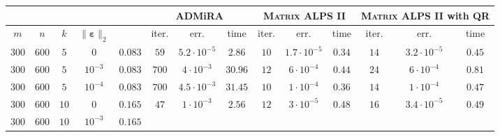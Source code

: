 \documentclass[twocolumn]{svjour3}
\newcommand{\vectornormbig}[1]{\big\|#1\big\|}
\newcommand{\noise}{\boldsymbol{\varepsilon}}
\newcommand{\rank}{k}
\begin{document}
\begin{table*}[!htp]
\begin{center}
\begin{tabular}{|c|c|c|c|c|c|c|c|c|c|c|c|c|c|}
\hline \hline \hline
\multicolumn{4}{c|}{} & & \multicolumn{3}{|c|}{ADMiRA} & \multicolumn{3}{|c|}{\textsc{Matrix ALPS II}} & \multicolumn{3}{|c}{\textsc{Matrix ALPS II} with QR} \\
\hline \hline
\multicolumn{1}{c}{$m$} & \multicolumn{1}{c}{$n$} & \multicolumn{1}{c}{$\rank$} & \multicolumn{1}{c|}{$\vectornormbig{\noise}_2$} & & 
\multicolumn{1}{|c}{\rm{iter.}} & \multicolumn{1}{c}{\rm{err.}} & \multicolumn{1}{c|}{\rm{time}} &
\multicolumn{1}{|c}{\rm{iter.}} & \multicolumn{1}{c}{\rm{err.}} & \multicolumn{1}{c|}{\rm{time}} &
\multicolumn{1}{|c}{\rm{iter.}} & \multicolumn{1}{c}{\rm{err.}} & \multicolumn{1}{c}{\rm{time}} \\
\hline\hline
\multicolumn{1}{c}{$300$} & \multicolumn{1}{c}{$600$} & \multicolumn{1}{c}{$5$} & \multicolumn{1}{c|}{$0$} & $0.083$ & 
\multicolumn{1}{|c}{$59$} & \multicolumn{1}{c}{$5.2\cdot 10^{-5}$} & \multicolumn{1}{c|}{$2.86$} &
\multicolumn{1}{|c}{$10$} & \multicolumn{1}{c}{$1.7\cdot 10^{-5}$} & \multicolumn{1}{c|}{$0.34$} &
\multicolumn{1}{|c}{$14$} & \multicolumn{1}{c}{$3.2\cdot 10^{-5}$} & \multicolumn{1}{c}{$0.45$} \\
\hline
\multicolumn{1}{c}{$300$} & \multicolumn{1}{c}{$600$} & \multicolumn{1}{c}{$5$} & \multicolumn{1}{c|}{$10^{-3}$} & $0.083$ & 
\multicolumn{1}{|c}{$700$} & \multicolumn{1}{c}{$4\cdot 10^{-3}$} & \multicolumn{1}{c|}{$30.96$} &
\multicolumn{1}{|c}{$12$} & \multicolumn{1}{c}{$6\cdot 10^{-4}$} & \multicolumn{1}{c|}{$0.44$} &
\multicolumn{1}{|c}{$24$} & \multicolumn{1}{c}{$6\cdot 10^{-4}$} & \multicolumn{1}{c}{$0.81$} \\
\hline
\multicolumn{1}{c}{$300$} & \multicolumn{1}{c}{$600$} & \multicolumn{1}{c}{$5$} & \multicolumn{1}{c|}{$10^{-4}$} & $0.083$ & 
\multicolumn{1}{|c}{$700$} & \multicolumn{1}{c}{$4.5\cdot 10^{-3}$} & \multicolumn{1}{c|}{$31.45$} &
\multicolumn{1}{|c}{$10$} & \multicolumn{1}{c}{$1\cdot 10^{-4}$} & \multicolumn{1}{c|}{$0.36$} &
\multicolumn{1}{|c}{$14$} & \multicolumn{1}{c}{$1\cdot 10^{-4}$} & \multicolumn{1}{c}{$0.47$} \\
\hline
\multicolumn{1}{c}{$300$} & \multicolumn{1}{c}{$600$} & \multicolumn{1}{c}{$10$} & \multicolumn{1}{c|}{$0$} & $0.165$ & 
\multicolumn{1}{|c}{$47$} & \multicolumn{1}{c}{$1\cdot 10^{-3}$} & \multicolumn{1}{c|}{$2.56$} &
\multicolumn{1}{|c}{$12$} & \multicolumn{1}{c}{$3\cdot 10^{-5}$} & \multicolumn{1}{c|}{$0.48$} &
\multicolumn{1}{|c}{$16$} & \multicolumn{1}{c}{$3.4\cdot 10^{-5}$} & \multicolumn{1}{c}{$0.49$} \\
\hline
\multicolumn{1}{c}{$300$} & \multicolumn{1}{c}{$600$} & \multicolumn{1}{c}{$10$} & \multicolumn{1}{c|}{$10^{-3}$} & $0.165$ & 

\end{tabular}
\end{center}
\end{table*}
\end{document}
